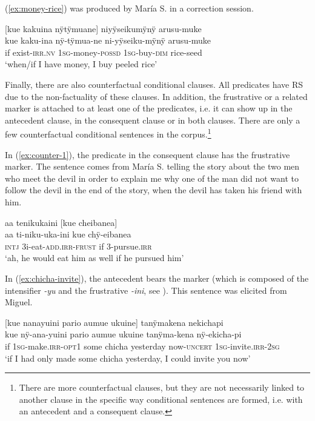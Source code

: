 (\ref{ex:money-rice}) was produced by María S. in a correction session.

\ea\label{ex:money-rice}
\begingl
\glpreamble \textup{[}kue kakuina nÿtÿmuane\textup{]} niyÿseikumÿnÿ arusu-muke\\
\gla kue kaku-ina nÿ-tÿmua-ne ni-yÿseiku-mÿnÿ arusu-muke\\
\glb if exist-\textsc{irr.nv} 1\textsc{sg}-money-\textsc{possd} 1\textsc{sg}-buy-\textsc{dim} rice-seed\\
\glft ‘when/if I have money, I buy peeled rice’
\endgl
\trailingcitation{[rxx-e121128s-3.28]}
\xe

Finally, there are also counterfactual conditional clauses. All predicates have  RS due to the non-factuality of these clauses. In addition, the frustrative or a related marker is attached to at least one of the predicates, i.e. it can show up in the antecedent clause, in the consequent clause or in both clauses. There are only a few counterfactual conditional sentences in the corpus.\footnote{There are more counterfactual clauses, but they are not necessarily linked to another clause in the specific way conditional sentences are formed, i.e. with an antecedent and a consequent clause.} 

In (\ref{ex:counter-1}), the predicate in the consequent clause has the frustrative marker. The sentence comes from María S. telling the story about the two men who meet the devil in order to explain me why one of the man did not want to follow the devil in the end of the story, when the devil has taken his friend with him.

\ea\label{ex:counter-1}
\begingl
\glpreamble aa tenikukaini \textup{[}kue cheibanea\textup{]}\\
\gla aa ti-niku-uka-ini kue chÿ-eibanea\\
\glb \textsc{intj} 3i-eat-\textsc{add.irr}-\textsc{frust} if 3-pursue.\textsc{irr}\\
\glft ‘ah, he would eat him as well if he pursued him’
\endgl
\trailingcitation{[rxx-n120511l-2.63-64]}
\xe

In (\ref{ex:chicha-invite}), the antecedent bears the  marker (which is composed of the intensifier \textit{-yu} and the frustrative \textit{-ini}, see ). This sentence was elicited from Miguel.

\ea\label{ex:chicha-invite}
\begingl
\glpreamble \textup{[}kue nanayuini pario aumue ukuine\textup{]} tanÿmakena nekichapi \\
\gla kue nÿ-ana-yuini pario aumue ukuine tanÿma-kena nÿ-ekicha-pi \\
\glb if 1\textsc{sg}-make.\textsc{irr}-\textsc{opt}1 some chicha yesterday now-\textsc{uncert} 1\textsc{sg}-invite.\textsc{irr}-2\textsc{sg}\\
\glft ‘if I had only made some chicha yesterday, I could invite you now’
\endgl
\trailingcitation{[mxx-e160811sd.438]}
\xe



